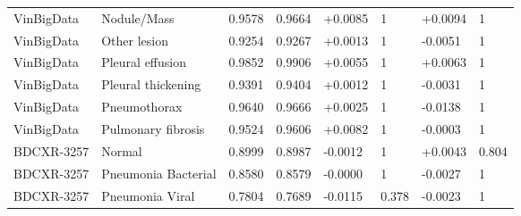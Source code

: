 \begin{tabular}{llllllll}
VinBigData & Nodule/Mass & 0.9578 & 0.9664 & +0.0085 & 1 & +0.0094 & 1 \\
VinBigData & Other lesion & 0.9254 & 0.9267 & +0.0013 & 1 & -0.0051 & 1 \\
VinBigData & Pleural effusion & 0.9852 & 0.9906 & +0.0055 & 1 & +0.0063 & 1 \\
VinBigData & Pleural thickening & 0.9391 & 0.9404 & +0.0012 & 1 & -0.0031 & 1 \\
VinBigData & Pneumothorax & 0.9640 & 0.9666 & +0.0025 & 1 & -0.0138 & 1 \\
VinBigData & Pulmonary fibrosis & 0.9524 & 0.9606 & +0.0082 & 1 & -0.0003 & 1 \\
BDCXR-3257 & Normal & 0.8999 & 0.8987 & -0.0012 & 1 & +0.0043 & 0.804 \\
BDCXR-3257 & Pneumonia Bacterial & 0.8580 & 0.8579 & -0.0000 & 1 & -0.0027 & 1 \\
BDCXR-3257 & Pneumonia Viral & 0.7804 & 0.7689 & -0.0115 & 0.378 & -0.0023 & 1 \\
\bottomrule
\end{tabular}
